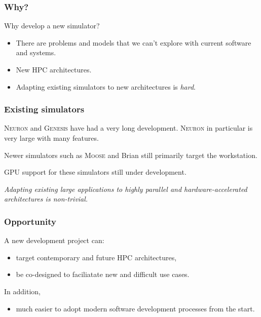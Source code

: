 \documentclass[aspectratio=43,12pt]{beamer}
\newcommand{\subheading}[1]{{\large #1}}
\begin{document}
\begin{frame}
\frametitle{Why?}
\subheading{Why develop a new simulator?}
\vfill
\begin{itemize}
\item
\textcolor{light-grey}{%
There are problems and models that we can't explore
with current software and systems.}
\item
\textcolor{light-grey}{%
New HPC architectures.
}
\item
Adapting existing simulators to new architectures is \emph{hard}.
\end{itemize}
\vfill
\end{frame}

\begin{frame}
\frametitle{Existing simulators}

\textsc{Neuron} and \textsc{Genesis} have had a very long development.
\textsc{Neuron} in particular is very large with many features.

\vspace{2ex}
Newer simulators such as \textsc{Moose} and Brian still primarily
target the workstation.

\vspace{2ex}
GPU support for these simulators still under development.

\vspace{2ex}
\emph{Adapting existing large applications to highly parallel
and hardware-accelerated architectures is non-trivial.}

\end{frame}

\begin{frame}
\frametitle{Opportunity}
A new development project can:
\vfill
\begin{itemize}
\item target contemporary and future HPC architectures,
\item be co-designed to faciliatate new and difficult use cases.
\end{itemize}

\vfill
\pause
In addition,
\begin{itemize}
\item much easier to adopt modern software development processes from the start.
\end{itemize}
\vfill
\end{frame}
\end{document}
